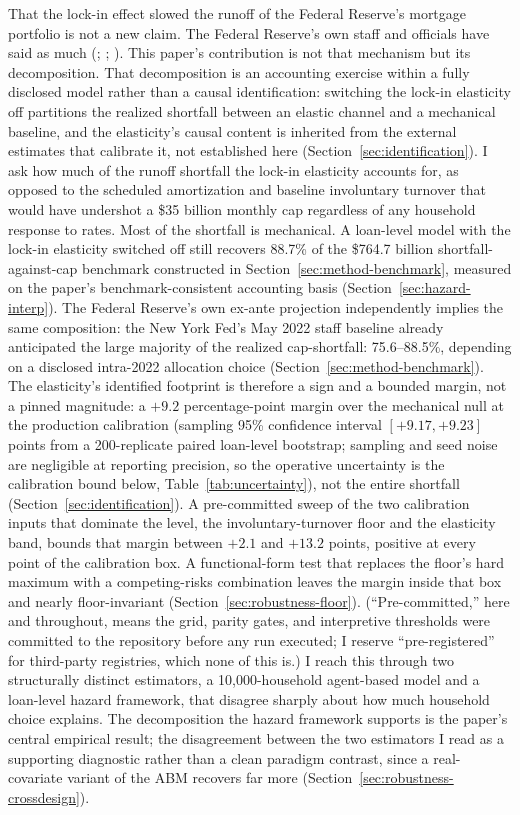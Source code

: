 \documentclass[12pt]{article}
\begin{document}
That the lock-in effect slowed the runoff of the Federal Reserve's mortgage portfolio is not a new claim. The Federal Reserve's own staff and officials have said as much (\citealp{na2024}; \citealp{perli2024}; \citealp{hammack2025}). This paper's contribution is not that mechanism but its decomposition. That decomposition is an accounting exercise within a fully disclosed model rather than a causal identification: switching the lock-in elasticity off partitions the realized shortfall between an elastic channel and a mechanical baseline, and the elasticity's causal content is inherited from the external estimates that calibrate it, not established here (Section~\ref{sec:identification}). I ask how much of the runoff shortfall the lock-in elasticity accounts for, as opposed to the scheduled amortization and baseline involuntary turnover that would have undershot a \$35 billion monthly cap regardless of any household response to rates. Most of the shortfall is mechanical. A loan-level model with the lock-in elasticity switched off still recovers 88.7\% of the \$764.7 billion shortfall-against-cap benchmark constructed in Section~\ref{sec:method-benchmark}, measured on the paper's benchmark-consistent accounting basis (Section~\ref{sec:hazard-interp}). The Federal Reserve's own ex-ante projection independently implies the same composition: the New York Fed's May 2022 staff baseline already anticipated the large majority of the realized cap-shortfall: 75.6--88.5\%, depending on a disclosed intra-2022 allocation choice (Section~\ref{sec:method-benchmark}). The elasticity's identified footprint is therefore a sign and a bounded margin, not a pinned magnitude: a $+9.2$ percentage-point margin over the mechanical null at the production calibration (sampling 95\% confidence interval $[+9.17, +9.23]$ points from a 200-replicate paired loan-level bootstrap; sampling and seed noise are negligible at reporting precision, so the operative uncertainty is the calibration bound below, Table~\ref{tab:uncertainty}), not the entire shortfall (Section~\ref{sec:identification}). A pre-committed sweep of the two calibration inputs that dominate the level, the involuntary-turnover floor and the elasticity band, bounds that margin between $+2.1$ and $+13.2$ points, positive at every point of the calibration box. A functional-form test that replaces the floor's hard maximum with a competing-risks combination leaves the margin inside that box and nearly floor-invariant (Section~\ref{sec:robustness-floor}). (``Pre-committed,'' here and throughout, means the grid, parity gates, and interpretive thresholds were committed to the repository before any run executed; I reserve ``pre-registered'' for third-party registries, which none of this is.) I reach this through two structurally distinct estimators, a 10,000-household agent-based model and a loan-level hazard framework, that disagree sharply about how much household choice explains. The decomposition the hazard framework supports is the paper's central empirical result; the disagreement between the two estimators I read as a supporting diagnostic rather than a clean paradigm contrast, since a real-covariate variant of the ABM recovers far more (Section~\ref{sec:robustness-crossdesign}).
\end{document}
